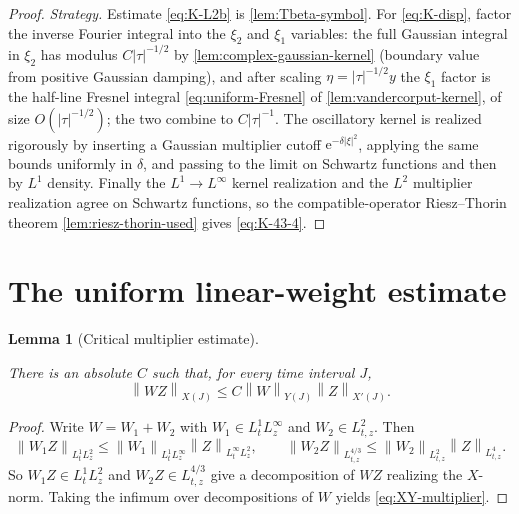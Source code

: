\documentclass[11pt,oneside]{book}
\providecommand{\uses}[1]{}
\newtheorem{lemma}[theorem]{Lemma}
\theoremstyle{definition}
\theoremstyle{remark}
\newcommand{\1}{\mathbf 1}
\newcommand{\norm}[1]{\left\lVert #1\right\rVert}
\newcommand{\e}{\mathrm e}
\begin{document}
\begin{proof}
\uses{lem:Tbeta-symbol, lem:vandercorput-kernel, lem:complex-gaussian-kernel, lem:riesz-thorin-used}
\emph{Strategy.} Estimate \eqref{eq:K-L2b} is \cref{lem:Tbeta-symbol}. For \eqref{eq:K-disp},
factor the inverse Fourier integral into the $\xi_2$ and $\xi_1$ variables: the full Gaussian
integral in $\xi_2$ has modulus $C|\tau|^{-1/2}$ by \cref{lem:complex-gaussian-kernel}
(boundary value from positive Gaussian damping), and after scaling $\eta=|\tau|^{-1/2}y$ the
$\xi_1$ factor is the half-line Fresnel integral \eqref{eq:uniform-Fresnel} of
\cref{lem:vandercorput-kernel}, of size $O(|\tau|^{-1/2})$; the two combine to
$C|\tau|^{-1}$. The oscillatory kernel is realized rigorously by inserting a Gaussian
multiplier cutoff $\e^{-\delta|\xi|^2}$, applying the same bounds uniformly in $\delta$, and
passing to the limit on Schwartz functions and then by $L^1$ density. Finally the
$L^1\to L^\infty$ kernel realization and the $L^2$ multiplier realization agree on Schwartz
functions, so the compatible-operator Riesz--Thorin theorem \cref{lem:riesz-thorin-used}
gives \eqref{eq:K-43-4}.
\end{proof}

\section{The uniform linear-weight estimate}

\begin{lemma}[Critical multiplier estimate]\label{lem:XY-multiplier}
\uses{def:carleman-spaces}
There is an absolute $C$ such that, for every time interval $J$,
\begin{equation}
 \norm{WZ}_{X(J)}\le C\norm W_{Y(J)}\norm Z_{X'(J)}. \label{eq:XY-multiplier}
\end{equation}
\end{lemma}

\begin{proof}
\uses{def:carleman-spaces}
Write $W=W_1+W_2$ with $W_1\in L^1_tL^\infty_z$ and $W_2\in L^2_{t,z}$. Then
\[
 \norm{W_1Z}_{L^1_tL^2_z}\le\norm{W_1}_{L^1_tL^\infty_z}\norm Z_{L^\infty_tL^2_z},
 \qquad
 \norm{W_2Z}_{L^{4/3}_{t,z}}\le\norm{W_2}_{L^2_{t,z}}\norm Z_{L^4_{t,z}}.
\]
So $W_1Z\in L^1_tL^2_z$ and $W_2Z\in L^{4/3}_{t,z}$ give a decomposition of $WZ$ realizing
the $X$-norm. Taking the infimum over decompositions of $W$ yields \eqref{eq:XY-multiplier}.
\end{proof}
\end{document}
